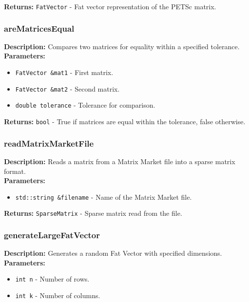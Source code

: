 \documentclass[12pt,oneside]{book} %
\begin{document}
\begin{subappendices}
    \textbf{Returns:} \texttt{FatVector} - Fat vector representation of the PETSc matrix.

    \subsubsection{areMatricesEqual}
    \textbf{Description:} Compares two matrices for equality within a specified tolerance.\\

    \textbf{Parameters:}
    \begin{itemize}
        \item \texttt{FatVector \&mat1} - First matrix.
        \item \texttt{FatVector \&mat2} - Second matrix.
        \item \texttt{double tolerance} - Tolerance for comparison.
    \end{itemize}

    \textbf{Returns:} \texttt{bool} - True if matrices are equal within the tolerance, false otherwise.

    \subsubsection{readMatrixMarketFile}
    \textbf{Description:} Reads a matrix from a Matrix Market file into a sparse matrix format.\\

    \textbf{Parameters:}
    \begin{itemize}
        \item \texttt{std::string \&filename} - Name of the Matrix Market file.
    \end{itemize}

    \textbf{Returns:} \texttt{SparseMatrix} - Sparse matrix read from the file.

    \subsubsection{generateLargeFatVector}
    \textbf{Description:} Generates a random Fat Vector with specified dimensions.\\

    \textbf{Parameters:}
    \begin{itemize}
        \item \texttt{int n} - Number of rows.
        \item \texttt{int k} - Number of columns.
    \end{itemize}


\end{subappendices}
\end{document}
